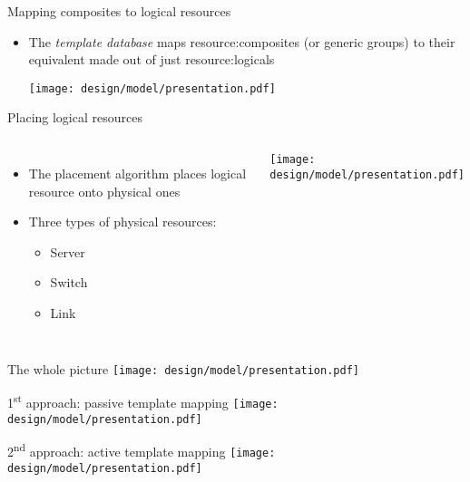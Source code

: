 \begin{frame}{Mapping composites to logical resources}
    \begin{itemize}
        \item The \textit{template database} maps \glspl{resource:composite} (or generic groups) to their equivalent made out of just \glspl{resource:logical}
        \begin{center}
            \texttt{[image: design/model/presentation.pdf]}
        \end{center}
    \end{itemize}
\end{frame}

\begin{frame}{Placing logical resources}
    \begin{columns}[T,onlytextwidth]
        \begin{itemize}
            \item The placement algorithm places logical resource onto physical ones
            \item Three types of physical resources:
            \begin{itemize}
                \item Server
                \item Switch
                \item Link
            \end{itemize}
        \end{itemize}
        \texttt{[image: design/model/presentation.pdf]}
    \end{columns}
\end{frame}

\begin{frame}{The whole picture}
    \centering
    \texttt{[image: design/model/presentation.pdf]}
\end{frame}

\begin{frame}{1\textsuperscript{st} approach: passive template mapping}
    \centering
    \texttt{[image: design/model/presentation.pdf]}
\end{frame}

\begin{frame}{2\textsuperscript{nd} approach: active template mapping}
    \centering
    \texttt{[image: design/model/presentation.pdf]}
\end{frame}
